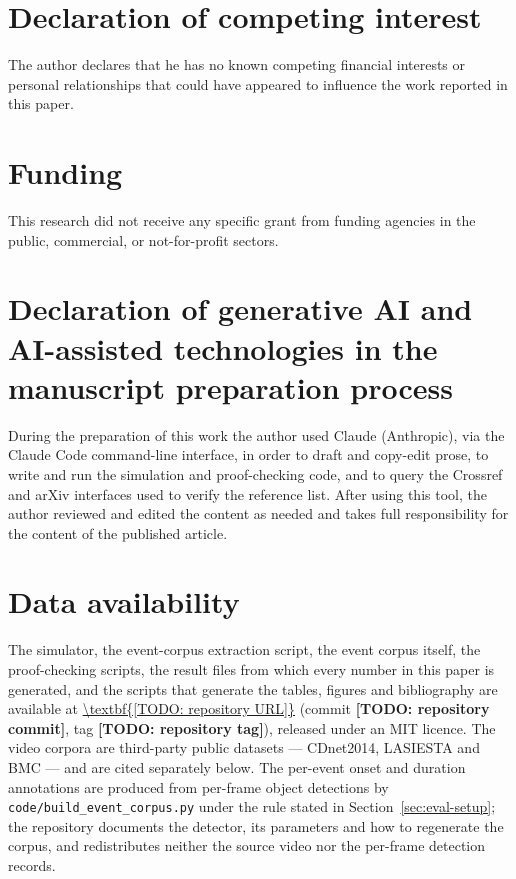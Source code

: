 \documentclass[final,5p,times,twocolumn]{elsarticle}
\newcommand{\numRepoUrl}{\TODO{repository URL}}
\newcommand{\numRepoCommit}{\TODO{repository commit}}
\newcommand{\numRepoTag}{\TODO{repository tag}}
\newcommand{\TODO}[1]{\textbf{[TODO: #1]}}
\theoremstyle{definition}
\begin{document}
\section*{Declaration of competing interest}
The author declares that he has no known competing financial interests or personal relationships
that could have appeared to influence the work reported in this paper.

\section*{Funding}
This research did not receive any specific grant from funding agencies in the public, commercial,
or not-for-profit sectors.

\section*{Declaration of generative AI and AI-assisted technologies in the manuscript
preparation process}
During the preparation of this work the author used Claude (Anthropic), via the Claude Code
command-line interface, in order to draft and copy-edit prose, to write and run the simulation and
proof-checking code, and to query the Crossref and arXiv interfaces used to verify the reference
list. After using this tool, the author reviewed and edited the content as needed and takes full
responsibility for the content of the published article.

\section*{Data availability}
The simulator, the event-corpus extraction script, the event corpus itself, the proof-checking
scripts, the result files from which every number in this paper is generated, and the scripts
that generate the tables, figures and bibliography are available at
\expandafter\url\expandafter{\numRepoUrl} (commit \numRepoCommit, tag \numRepoTag), released
under an MIT licence. The
video corpora are third-party public datasets --- CDnet2014, LASIESTA and BMC --- and are cited
separately below. The per-event onset and duration annotations are produced from per-frame
object detections by \texttt{code/build\_event\_corpus.py} under the rule stated in
Section~\ref{sec:eval-setup}; the repository documents the detector, its parameters and how to
regenerate the corpus, and redistributes neither the source video nor the per-frame detection
records.



\end{document}
